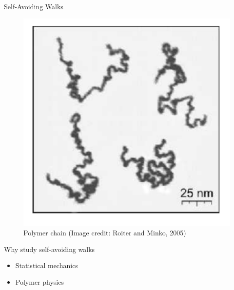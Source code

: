 \documentclass{if-beamer}
\begin{document}
\begin{frame}{Self-Avoiding Walks}
\begin{figure}
\begin{minipage}{0.37\textwidth}
            \includegraphics[width=\textwidth]{figures/polymer.png}
            \caption{Polymer chain (Image credit: Roiter and Minko, 2005)}
        \end{minipage}
    \end{figure}

\begin{block}{Why study self-avoiding walks}
    \begin{itemize}
    \item Statistical mechanics
    \item Polymer physics
    \end{itemize}
\end{block}
\end{frame}
\end{document}

